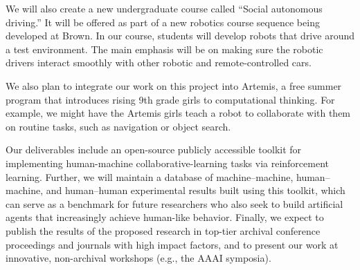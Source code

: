 We will also create a new undergraduate course called ``Social
autonomous driving.''  It will be offered as part of a new robotics
course sequence being developed at Brown.  In our course, students
will develop robots that drive around a test environment.  The main
emphasis will be on making sure the robotic drivers interact smoothly
with other robotic and remote-controlled cars.

We also plan to integrate our work on this project into Artemis, a
free summer program that introduces rising 9th grade girls to
computational thinking.  For example, we might have the Artemis girls
teach a robot to collaborate with them on routine tasks, such as
navigation or object search.

Our deliverables include an open-source publicly accessible toolkit
for implementing human-machine collaborative-learning tasks via
reinforcement learning. Further, we will maintain a database of
machine--machine, human--machine, and human--human experimental results
built using this toolkit, which can serve as a benchmark for future
researchers who also seek to build artificial agents that increasingly
achieve human-like behavior.
%
Finally, we expect to publish the results of the proposed research in
top-tier archival conference proceedings and journals with high
impact factors, and to present our work at innovative, non-archival
workshops (e.g., the AAAI symposia).

